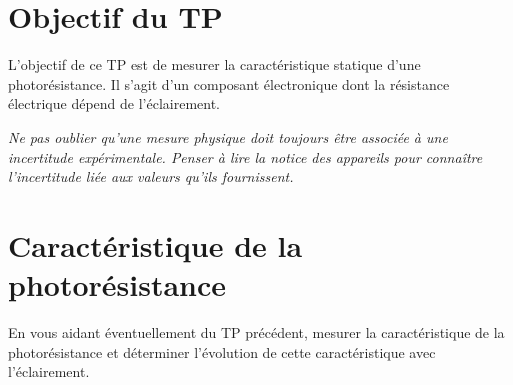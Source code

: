 \documentclass[]{tp}
\begin{document}

\section{Objectif du TP}
L'objectif de ce TP est de mesurer la caractéristique statique d'une photorésistance. Il s'agit d'un composant électronique dont la résistance électrique dépend de l'éclairement.

\vspace{1em}
\textit{Ne pas oublier qu'une mesure physique doit toujours être associée à une incertitude expérimentale. Penser à lire la notice des appareils pour connaître l'incertitude liée aux valeurs qu'ils fournissent.}

\section{Caractéristique de la photorésistance}

En vous aidant éventuellement du TP précédent, mesurer la caractéristique de la photorésistance et déterminer l'évolution de cette caractéristique avec l'éclairement.
\end{document}
